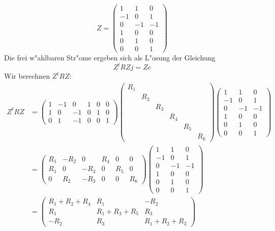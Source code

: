 {\begin{loesung}
\begin{teilaufgaben}
\[
Z=
\begin{pmatrix}
 1& 1& 0\\
-1& 0& 1\\
 0&-1&-1\\
 1& 0& 0\\
 0& 1& 0\\
 0& 0& 1
\end{pmatrix}
\]
Die frei w"ahlbaren Str"ome ergeben sich als L"osung der
Gleichung
\[
Z^tRZj=Ze
\]
Wir berechnen $Z^tRZ$:
\begin{align*}
Z^tRZ&=
\begin{pmatrix}
   1& -1&  0&  1&  0&  0\\
   1&  0& -1&  0&  1&  0\\
   0&  1& -1&  0&  0&  1
\end{pmatrix}
\begin{pmatrix}
R_1&   &   &   &   &   \\
   &R_2&   &   &   &   \\
   &   &R_3&   &   &   \\
   &   &   &R_4&   &   \\
   &   &   &   &R_5&   \\
   &   &   &   &   &R_6
\end{pmatrix}
\begin{pmatrix}
 1& 1& 0\\
-1& 0& 1\\
 0&-1&-1\\
 1& 0& 0\\
 0& 1& 0\\
 0& 0& 1
\end{pmatrix}
\\
&=
\begin{pmatrix}
 R_1&-R_2&   0& R_4&   0&   0\\
 R_1&   0&-R_3&   0& R_5&   0\\
   0& R_2&-R_3&   0&   0& R_6
\end{pmatrix}
\begin{pmatrix}
 1& 1& 0\\
-1& 0& 1\\
 0&-1&-1\\
 1& 0& 0\\
 0& 1& 0\\
 0& 0& 1
\end{pmatrix}
\\
&=
\begin{pmatrix}
R_1+R_2+R_4&R_1&-R_2\\
R_1&R_1+R_3+R_5&R_3\\
-R_2&R_3&R_1+R_2+R_3

\end{pmatrix}
\end{align*}
\end{teilaufgaben}
\end{loesung}}
